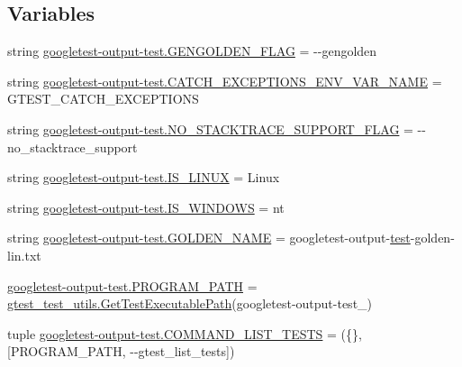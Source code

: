 \subsection*{Variables}
\begin{DoxyCompactItemize}
\item 
string \mbox{\hyperlink{namespacegoogletest-output-test_ad0d41196cc1dba894e54cd7129b5fc0a}{googletest-\/output-\/test.\+G\+E\+N\+G\+O\+L\+D\+E\+N\+\_\+\+F\+L\+AG}} = \textquotesingle{}-\/-\/gengolden\textquotesingle{}
\item 
string \mbox{\hyperlink{namespacegoogletest-output-test_ae6116e1d24bc75b7559e53353b8ee91c}{googletest-\/output-\/test.\+C\+A\+T\+C\+H\+\_\+\+E\+X\+C\+E\+P\+T\+I\+O\+N\+S\+\_\+\+E\+N\+V\+\_\+\+V\+A\+R\+\_\+\+N\+A\+ME}} = \textquotesingle{}G\+T\+E\+S\+T\+\_\+\+C\+A\+T\+C\+H\+\_\+\+E\+X\+C\+E\+P\+T\+I\+O\+NS\textquotesingle{}
\item 
string \mbox{\hyperlink{namespacegoogletest-output-test_aa5200b284ce09415c0061e96811cf24c}{googletest-\/output-\/test.\+N\+O\+\_\+\+S\+T\+A\+C\+K\+T\+R\+A\+C\+E\+\_\+\+S\+U\+P\+P\+O\+R\+T\+\_\+\+F\+L\+AG}} = \textquotesingle{}-\/-\/no\+\_\+stacktrace\+\_\+support\textquotesingle{}
\item 
string \mbox{\hyperlink{namespacegoogletest-output-test_a7ff614069cc92eea5943d720b479afd7}{googletest-\/output-\/test.\+I\+S\+\_\+\+L\+I\+N\+UX}} = \textquotesingle{}Linux\textquotesingle{}
\item 
string \mbox{\hyperlink{namespacegoogletest-output-test_a88183ad6c50d9f025ab11d07e5b4d9ec}{googletest-\/output-\/test.\+I\+S\+\_\+\+W\+I\+N\+D\+O\+WS}} = \textquotesingle{}nt\textquotesingle{}
\item 
string \mbox{\hyperlink{namespacegoogletest-output-test_a66b45fb215424c968b479fbf864f1e7f}{googletest-\/output-\/test.\+G\+O\+L\+D\+E\+N\+\_\+\+N\+A\+ME}} = \textquotesingle{}googletest-\/output-\/\mbox{\hyperlink{_mutual_8h_a707ee03719e99670bf6cfdfd897b8456}{test}}-\/golden-\/lin.\+txt\textquotesingle{}
\item 
\mbox{\hyperlink{namespacegoogletest-output-test_a36302384d49a636defe86704a422acb2}{googletest-\/output-\/test.\+P\+R\+O\+G\+R\+A\+M\+\_\+\+P\+A\+TH}} = \mbox{\hyperlink{namespacegtest__test__utils_a89ed3717984a80ffbb7a9c92f71b86a2}{gtest\+\_\+test\+\_\+utils.\+Get\+Test\+Executable\+Path}}(\textquotesingle{}googletest-\/output-\/test\+\_\+\textquotesingle{})
\item 
tuple \mbox{\hyperlink{namespacegoogletest-output-test_accb05a0a5c9b083723186bb6116f928f}{googletest-\/output-\/test.\+C\+O\+M\+M\+A\+N\+D\+\_\+\+L\+I\+S\+T\+\_\+\+T\+E\+S\+TS}} = (\{\}, \mbox{[}P\+R\+O\+G\+R\+A\+M\+\_\+\+P\+A\+TH, \textquotesingle{}-\/-\/gtest\+\_\+list\+\_\+tests\textquotesingle{}\mbox{]})

\end{DoxyCompactItemize}

